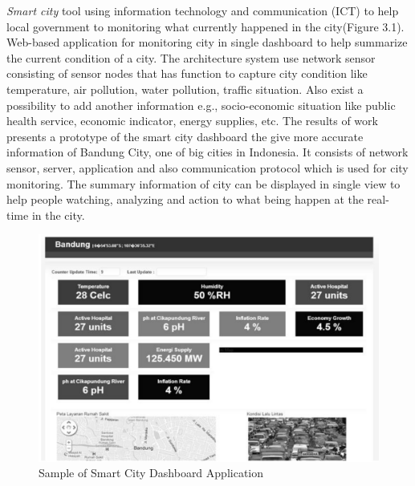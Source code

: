 	\emph{Smart city}\cite{6588063} tool using information technology and communication (ICT) to help local government to monitoring what currently happened in the city(Figure 3.1). Web-based application for monitoring city in single dashboard to help summarize the current condition of a city. The architecture system use network sensor consisting of sensor nodes that has function to capture city condition like temperature, air pollution, water pollution, traffic situation. Also exist a possibility to add another information e.g., socio-economic situation like public health service, economic indicator, energy supplies, etc. The results of work presents a prototype of the smart city dashboard the give more accurate information of Bandung City, one of big cities in Indonesia. It consists of network sensor, server, application and also communication protocol which is used for city monitoring. The summary information of city can be displayed in single view to help people watching, analyzing and action to what being happen at the real-time in the city.
	  \begin{figure}[!ht]
		\centering
		\includegraphics[scale=0.4]{Material/examples/SmartCity.png}   
		\caption[Sample of Smart City Dashboard Application]{Sample of Smart City Dashboard Application}                  
		\end{figure}

